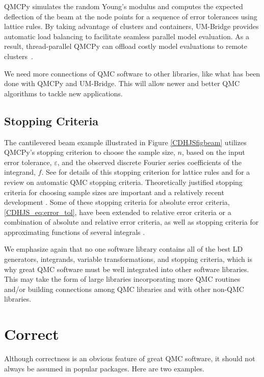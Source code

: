 \documentclass[graybox]{svmult}
\begin{document}
QMCPy simulates the random Young's modulus and computes the expected deflection of the beam at the node points for a sequence of error tolerances using lattice rules.  By taking advantage of clusters and containers, UM-Bridge provides automatic load balancing to facilitate seamless parallel model evaluation. As a result, thread-parallel QMCPy can offload costly model evaluations to remote clusters~\cite{seelinger2023lowering}.


We need more connections of QMC software to other libraries, like what has been done with  QMCPy and UM-Bridge.  This will allow newer and better QMC algorithms to tackle new applications.

\subsection{Stopping Criteria}
The cantilevered beam example illustrated in Figure \ref{CDHJSfigbeam} utilizes QMCPy's stopping criterion to choose the sample size, $n$, based on the input error tolerance, $\varepsilon$, and the observed discrete Fourier series coefficients of the integrand, $f$.  See \cite{HicJim16a} for details of this stopping criterion for lattice rules and \cite{HicEtal18a} for a review on automatic QMC stopping criteria.  Theoretically justified stopping criteria for choosing sample sizes are important and a relatively recent development \cite{HicEtal14a,HicJim16a,JimHic16a,RatHic19a,JagHic22a}.  Some of these stopping criteria for absolute error criteria, \eqref{CDHJS_eq:error_tol},  have been extended to relative error criteria or a combination of absolute and relative error criteria, as well as stopping criteria for approximating functions of several integrals \cite{Jia16a,GilJim16b,HicEtal17a,JagSor23a}.


\bigskip

We emphasize again that no one software library contains all of the best LD generators, integrands, variable transformations, and stopping criteria, which is why great QMC software must be well integrated into other software libraries.  This may take the form of large libraries incorporating more QMC routines and/or building connections among QMC libraries and with other non-QMC libraries.


\section{Correct} \label{CDHJS_sec:correct}
Although correctness is an obvious feature of great QMC software, it should not always be assumed in popular packages.  Here are two examples.
\end{document}
